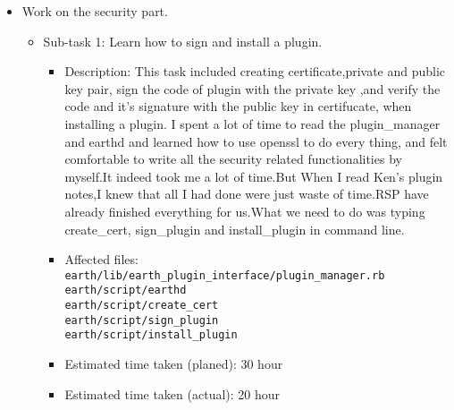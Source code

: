 \begin{itemize}
\item Work on the security part.
	     \begin{itemize}
              \item Sub-task 1: Learn how to sign and install a plugin.
                \begin{itemize}
	         \item Description: This task included creating certificate,private and public key pair, sign the code of plugin with the private key ,and verify the code and it's signature with the public key in certifucate, when installing a plugin. I spent a lot of time to read the plugin\_manager and earthd and learned how to use openssl to do every thing, and felt comfortable to write all the security related functionalities by myself.It indeed took me a lot of time.But When I read Ken's plugin notes,I knew that all I had done were just waste of time.RSP have already finished everything for us.What we need to do was typing create\_cert, sign\_plugin and install\_plugin in command line. 
	         \item Affected files: \\
                                       \texttt{earth/lib/earth\_plugin\_interface/plugin\_manager.rb}\\
                                        \texttt{earth/script/earthd}\\
                                        \texttt{earth/script/create\_cert}\\
                                        \texttt{earth/script/sign\_plugin}\\
                                        \texttt{earth/script/install\_plugin}\\ 
	      
	          \item Estimated time taken (planed): 30 hour
                  \item Estimated time taken (actual): 20 hour
	     \end{itemize}
             \end{itemize}


\end{itemize}
